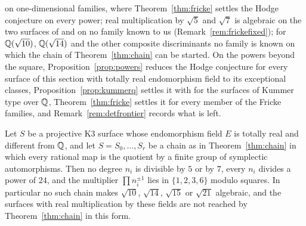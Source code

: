 on one-dimensional families, where Theorem~\ref{thm:fricke} settles the Hodge conjecture on every power; real multiplication by $\sqrt5$ and $\sqrt7$ is algebraic on the two surfaces of \cite{vGS25} and on no family known to us (Remark~\ref{rem:frickefixed}); for $\mathbb{Q}(\sqrt{10})$, $\mathbb{Q}(\sqrt{14})$ and the other composite discriminants no family is known on which the chain of Theorem~\ref{thm:chain} can be started. On the powers beyond the square, Proposition~\ref{prop:powers} reduces the Hodge conjecture for every surface of this section with totally real endomorphism field to its exceptional classes, Proposition~\ref{prop:kummerq} settles it with \Fiii{} for the surfaces of Kummer type over $\mathbb{Q}$, Theorem~\ref{thm:fricke} settles it for every member of the Fricke families, and Remark~\ref{rem:detfrontier} records what is left.

\begin{proposition}\label{prop:sqrt10}
Let $S$ be a projective K3 surface whose endomorphism field $E$ is totally real and different from $\mathbb{Q}$, and let $S=S_{0},\dots,S_{r}$ be a chain as in Theorem~\ref{thm:chain} in which every rational map is the quotient by a finite group of symplectic automorphisms. Then no degree $n_{i}$ is divisible by $5$ or by $7$, every $n_{i}$ divides a power of $24$, and the multiplier $\prod n_{i}^{\pm1}$ lies in $\{1,2,3,6\}$ modulo squares. In particular no such chain makes $\sqrt{10}$, $\sqrt{14}$, $\sqrt{15}$ or $\sqrt{21}$ algebraic, and the surfaces with real multiplication by these fields are not reached by Theorem~\ref{thm:chain} in this form.
\end{proposition}


